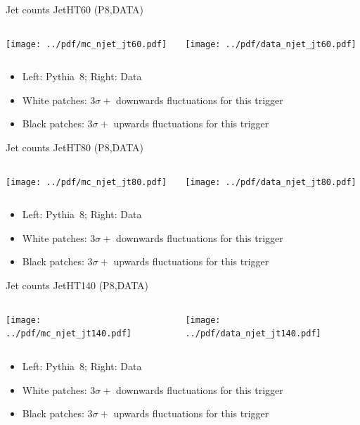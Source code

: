 \documentclass[9pt]{beamer}
\begin{document}
\begin{frame}[t]{Jet counts JetHT60 (P8,DATA)}
\begin{columns}[T]
  \begin{column}{.5\textwidth}
  \texttt{[image: ../pdf/mc\_njet\_jt60.pdf]}
  \end{column}
  \begin{column}{.5\textwidth}
  \texttt{[image: ../pdf/data\_njet\_jt60.pdf]}
  \end{column}
\end{columns}
\begin{itemize}
 \item Left: Pythia~8; Right: Data
 \item White patches: $3\sigma+$ downwards fluctuations for this trigger
 \item Black patches: $3\sigma+$ upwards fluctuations for this trigger
\end{itemize}
\end{frame}

\begin{frame}[t]{Jet counts JetHT80 (P8,DATA)}
\begin{columns}[T]
  \begin{column}{.5\textwidth}
  \texttt{[image: ../pdf/mc\_njet\_jt80.pdf]}
  \end{column}
  \begin{column}{.5\textwidth}
  \texttt{[image: ../pdf/data\_njet\_jt80.pdf]}
  \end{column}
\end{columns}
\begin{itemize}
 \item Left: Pythia~8; Right: Data
 \item White patches: $3\sigma+$ downwards fluctuations for this trigger
 \item Black patches: $3\sigma+$ upwards fluctuations for this trigger
\end{itemize}
\end{frame}

\begin{frame}[t]{Jet counts JetHT140 (P8,DATA)}
\begin{columns}[T]
  \begin{column}{.5\textwidth}
  \texttt{[image: ../pdf/mc\_njet\_jt140.pdf]}
  \end{column}
  \begin{column}{.5\textwidth}
  \texttt{[image: ../pdf/data\_njet\_jt140.pdf]}
  \end{column}
\end{columns}
\begin{itemize}
 \item Left: Pythia~8; Right: Data
 \item White patches: $3\sigma+$ downwards fluctuations for this trigger
 \item Black patches: $3\sigma+$ upwards fluctuations for this trigger
\end{itemize}
\end{frame}
\end{document}
